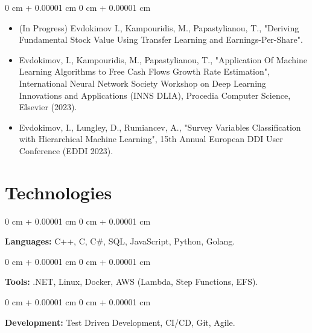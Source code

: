 \documentclass[10pt, letterpaper]{article}
\newenvironment{highlights}{
    \begin{itemize}[
        topsep=0.10 cm,
        parsep=0.10 cm,
        partopsep=0pt,
        itemsep=0pt,
        leftmargin=0 cm + 10pt
    ]
}{
    \end{itemize}
} %
\newenvironment{onecolentry}{
    \begin{adjustwidth}{
        0 cm + 0.00001 cm
    }{
        0 cm + 0.00001 cm
    }
}{
    \end{adjustwidth}
} %
\begin{document}
    \begin{onecolentry}
        \begin{highlights}
            \item (In Progress) Evdokimov I., Kampouridis, M., Papastylianou, T., "Deriving Fundamental Stock Value Using Transfer Learning and Earnings-Per-Share".
            \item Evdokimov, I., Kampouridis, M., Papastylianou, T., "Application Of Machine Learning Algorithms to Free Cash Flows Growth Rate Estimation", International Neural Network Society Workshop on Deep Learning Innovations and Applications (INNS DLIA), Procedia Computer Science, Elsevier (2023).
            \item Evdokimov, I., Lungley, D., Rumiancev, A., "Survey Variables Classification with Hierarchical Machine Learning", 15th Annual European DDI User Conference (EDDI 2023).
        \end{highlights}
    \end{onecolentry}


    \section{Technologies}
        
        \begin{onecolentry}
            \textbf{Languages:} C++, C, C\#, SQL, JavaScript, Python, Golang.
        \end{onecolentry}

        \vspace{0.2 cm}

        \begin{onecolentry}
            \textbf{Tools:} .NET, Linux, Docker, AWS (Lambda, Step Functions, EFS).
        \end{onecolentry}

        \vspace{0.2 cm}

        \begin{onecolentry}
            \textbf{Development:} Test Driven Development, CI/CD, Git, Agile.
        \end{onecolentry}
    
\end{document}
